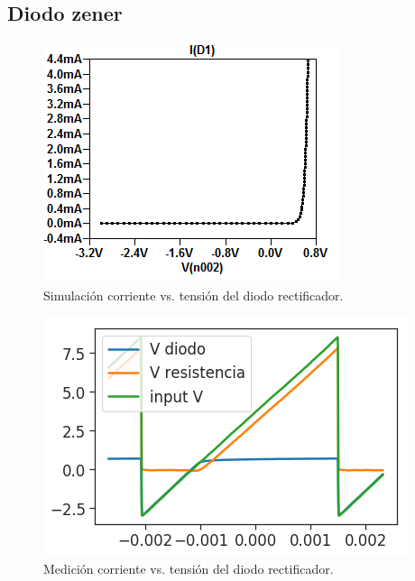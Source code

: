 \subsection*{\color{orange}Diodo zener}

\begin{figure}[!ht]
\centering
\includegraphics[scale=0.45]{../EJ1/DiodoRectificador/corrienteDiodo1}
\caption{Simulaci\'on corriente vs. tensi\'on del diodo rectificador.}
\label{med2a}
\end{figure}

\begin{figure}[!ht]
\centering
\includegraphics[scale=0.45]{../EJ1/DiodoRectificador/datosOsciloscopio}
\caption{Medici\'on corriente vs. tensi\'on del diodo rectificador.}
\label{med2b}
\end{figure}

